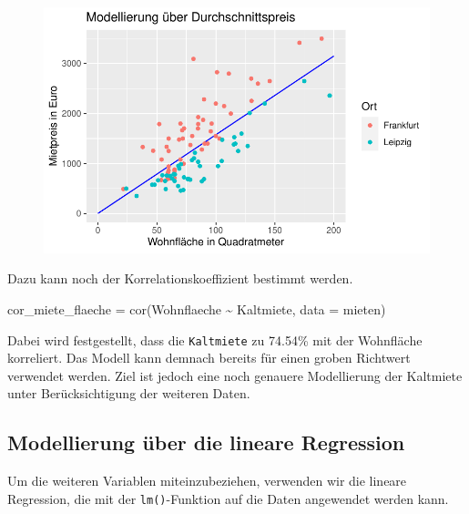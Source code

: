 \documentclass[
  a4paper,
  DIV=11]{scrartcl}
\newenvironment{Shaded}{\begin{snugshade}}{\end{snugshade}}
\newcommand{\AttributeTok}[1]{\textcolor[rgb]{0.40,0.45,0.13}{#1}}
\newcommand{\FunctionTok}[1]{\textcolor[rgb]{0.28,0.35,0.67}{#1}}
\newcommand{\NormalTok}[1]{\textcolor[rgb]{0.00,0.23,0.31}{#1}}
\newcommand{\OtherTok}[1]{\textcolor[rgb]{0.00,0.23,0.31}{#1}}
\newcommand{\SpecialCharTok}[1]{\textcolor[rgb]{0.37,0.37,0.37}{#1}}
\begin{document}
\begin{figure}[H]

{\centering \includegraphics{Mietmodellierung_files/figure-pdf/unnamed-chunk-23-1.pdf}

}

\end{figure}

Dazu kann noch der Korrelationskoeffizient bestimmt werden.

\begin{Shaded}
\begin{Highlighting}[]
\NormalTok{cor\_miete\_flaeche }\OtherTok{=} \FunctionTok{cor}\NormalTok{(Wohnflaeche }\SpecialCharTok{\textasciitilde{}}\NormalTok{ Kaltmiete, }\AttributeTok{data =}\NormalTok{ mieten)}
\end{Highlighting}
\end{Shaded}

Dabei wird festgestellt, dass die \texttt{Kaltmiete} zu 74.54\% mit der
Wohnfläche korreliert. Das Modell kann demnach bereits für einen groben
Richtwert verwendet werden. Ziel ist jedoch eine noch genauere
Modellierung der Kaltmiete unter Berücksichtigung der weiteren Daten.

\hypertarget{modellierung-uxfcber-die-lineare-regression}{%
\subsection{Modellierung über die lineare
Regression}\label{modellierung-uxfcber-die-lineare-regression}}

Um die weiteren Variablen miteinzubeziehen, verwenden wir die lineare
Regression, die mit der \texttt{lm()}-Funktion auf die Daten angewendet
werden kann.
\end{document}
